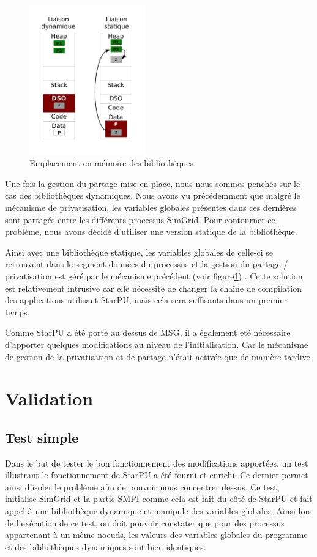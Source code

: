 \documentclass[smallextended]{svjour3}
\begin{document}
\begin{figure}
\begin{center}
\includegraphics[width=5cm]{./Img/StaticDyn.pdf}
\end{center}
\caption{\label{fig:5}Emplacement en mémoire des bibliothèques}
\end{figure}

Une fois la gestion du partage mise en place, nous nous sommes
penchés sur le cas des bibliothèques dynamiques. Nous avons vu
précédemment que malgré le mécanisme de privatisation, les variables
globales présentes dans ces dernières sont partagés entre les
différents processus SimGrid. Pour contourner ce problème, nous
avons décidé d'utiliser une version statique de la bibliothèque.  

Ainsi avec une bibliothèque statique, les variables globales de
celle-ci se retrouvent dans le segment données du processus et la
gestion du partage / privatisation est géré par le mécanisme
précédent (voir figure\ref{fig:5}) . Cette solution est relativement intrusive car
elle nécessite de changer la chaîne de compilation des applications
utilisant StarPU, mais cela sera suffisants dans un premier temps. 

Comme StarPU a été porté au dessus de MSG, il a également été
nécessaire d'apporter quelques modifications au niveau de
l'initialisation. Car le mécanisme de gestion de la privatisation et
de partage n'était activée que de manière tardive. 

\section{Validation}
\label{sec-6}
\subsection{Test simple}
\label{sec-6-1}
Dans le but de tester le bon fonctionnement des modifications
apportées, un test illustrant le fonctionnement de StarPU a été
fourni et enrichi. Ce dernier permet ainsi d'isoler le problème
afin de pouvoir nous concentrer dessus. Ce test, initialise SimGrid
et la partie SMPI comme cela est fait du côté de StarPU et fait
appel à une bibliothèque dynamique et manipule des variables
globales. Ainsi lors de l'exécution de ce test, on doit pouvoir
constater que pour des processus appartenant à un même noeuds, les
valeurs des variables globales du programme et des bibliothèques
dynamiques sont bien identiques.  
\end{document}
